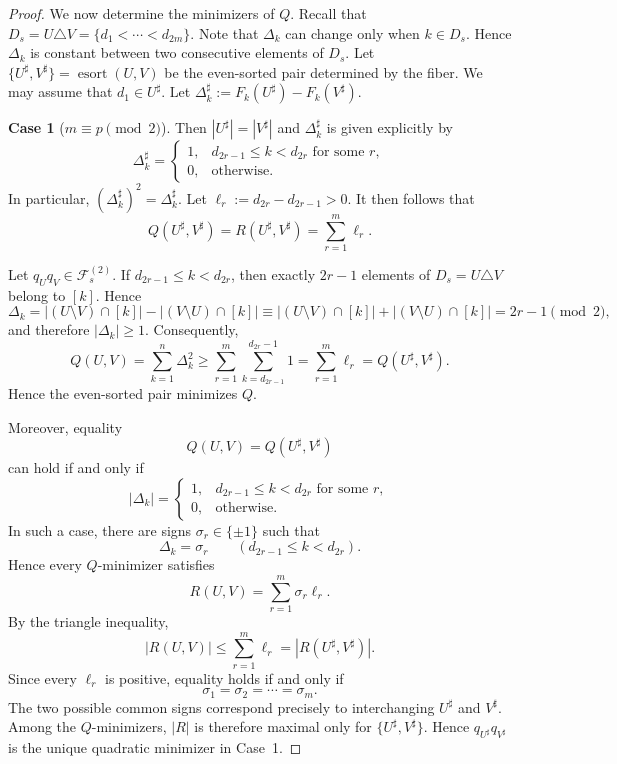 \documentclass[10pt,a4paper]{amsart}
\newcommand{\esort}{\operatorname{esort}}
\begin{document}
\begin{proof}
We now determine the minimizers of \(Q\). 
Recall that $D_s=U\triangle V=\{d_1<\cdots<d_{2m}\}$.
Note that $\Delta_k$ can change only when $k\in D_s$.
Hence $\Delta_k$ is constant between two consecutive elements of $D_s$.
Let $\{U^\sharp,V^\sharp\}=\esort(U,V)$ be the even-sorted pair determined by the fiber. 
We may assume that \(d_1\in U^\sharp\).
Let $ \Delta_k^\sharp
:= F_k(U^\sharp)-F_k(V^\sharp)$.

\medskip

\noindent
{\bf Case 1} (\(m\equiv p\pmod2\)). Then $|U^\sharp|=|V^\sharp|$
and $\Delta_k^\sharp$
is given explicitly by
\[
 \Delta_k^\sharp=
 \begin{cases}
1, & d_{2r-1}\le k<d_{2r}
    \text{ for some }r,\\
0, & \text{otherwise}.
 \end{cases}
\]
In particular, $(\Delta_k^\sharp)^2=\Delta_k^\sharp $.
Let $\ell_r:=d_{2r}-d_{2r-1}>0$. 
It then follows that
\[
Q(U^\sharp,V^\sharp) =
R(U^\sharp,V^\sharp) =
 \sum_{r=1}^m\ell_r.
\]

Let $q_Uq_V\in\mathcal{F}^{(2)}_s$.
If $d_{2r-1}\le k<d_{2r}$, then exactly $2r-1$ elements of
$D_s=U\triangle V$ belong to $[k]$. 
Hence
\[
\Delta_k
=
|(U\setminus V)\cap[k]|
-
|(V\setminus U)\cap[k]|
\equiv
|(U\setminus V)\cap[k]|
+
|(V\setminus U)\cap[k]|
= 2r - 1
\pmod 2
,\]
and therefore $|\Delta_k|\ge1$.
Consequently,
\[
Q(U,V) =
 \sum_{k=1}^n\Delta_k^2
 \ge
 \sum_{r=1}^m
 \sum_{k=d_{2r-1}}^{d_{2r}-1}1
=
 \sum_{r=1}^m\ell_r
= Q(U^\sharp,V^\sharp).
\]
Hence the even-sorted pair minimizes $Q$.

Moreover, equality
\[
Q(U,V)=Q(U^\sharp,V^\sharp)
\]
can hold if and only if 
\[
 |\Delta_k|=
 \begin{cases}
1, & d_{2r-1}\le k<d_{2r}
    \text{ for some }r,\\
0, & \text{otherwise}.
 \end{cases}
\]
In such a case,
there are signs $\sigma_r\in\{\pm1\}$
such that
\[
 \Delta_k=\sigma_r
 \qquad
(d_{2r-1}\le k<d_{2r}).
\]
Hence every \(Q\)-minimizer satisfies
\[
R(U,V) =
 \sum_{r=1}^m\sigma_r\ell_r.
\]
By the triangle inequality,
\[
|R(U,V)|
 \le
 \sum_{r=1}^m\ell_r
= |R(U^\sharp,V^\sharp)|.
\]
Since every \(\ell_r\) is positive, equality holds if and only if
\[
 \sigma_1=\sigma_2=\cdots=\sigma_m.
\]
The two possible common signs correspond precisely to interchanging
\(U^\sharp\) and \(V^\sharp\).
Among the $Q$-minimizers, $|R|$ is therefore maximal only for $\{U^\sharp,V^\sharp\}$. Hence $q_{U^\sharp}q_{V^\sharp}$ is the unique quadratic minimizer in Case~1.


\end{proof}
\end{document}
